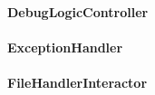\documentclass[parskip=full]{scrartcl}
\begin{document}
\paragraph{DebugLogicController}
\paragraph{ExceptionHandler}
\paragraph{FileHandlerInteractor}
\end{document}

